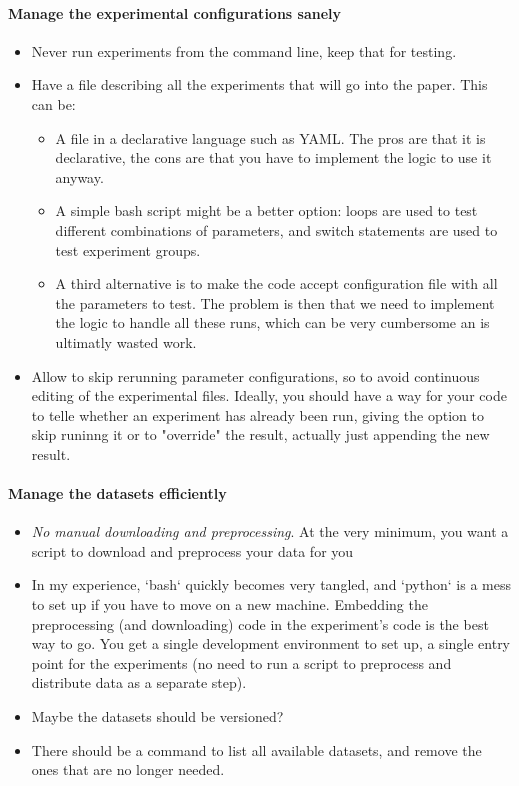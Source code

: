 \documentclass{llncs}
\begin{document}
\paragraph{Manage the experimental configurations sanely}

\begin{itemize}
\item Never run experiments from the command line, keep that for testing.
\item Have a file describing all the experiments that will go into the paper. This
  can be:
  \begin{itemize}
  \item A file in a declarative language such as YAML. The pros are that it is
    declarative, the cons are that you have to implement the logic to use it
    anyway.
  \item A simple bash script might be a better option: loops are used to test
      different combinations of parameters, and switch statements are used to
      test experiment groups.
  \item A third alternative is to make the code accept configuration file with all
      the parameters to test. The problem is then that we need to implement the
      logic to handle all these runs, which can be very cumbersome an is
      ultimatly wasted work.
  \end{itemize}
\item Allow to skip rerunning parameter configurations, so to avoid continuous
  editing of the experimental files. Ideally, you should have a way for your
  code to telle whether an experiment has already been run, giving the option
  to skip runinng it or to "override" the result, actually just appending the
  new result.
\end{itemize}

\paragraph{Manage the datasets efficiently}

\begin{itemize}
\item \emph{No manual downloading and preprocessing}. At the very minimum, you want a
  script to download and preprocess your data for you
\item In my experience, `bash` quickly becomes very tangled, and `python` is a mess
  to set up if you have to move on a new machine. Embedding the preprocessing
  (and downloading) code in the experiment's code is the best way to go. You
  get a single development environment to set up, a single entry point for the
  experiments (no need to run a script to preprocess and distribute data as a
  separate step).
\item Maybe the datasets should be versioned?
\item There should be a command to list all available datasets, and remove the ones
  that are no longer needed.
\end{itemize}
\end{document}
